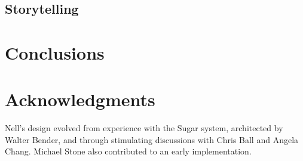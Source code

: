 \documentclass{acm_proc_article-sp}
\begin{document}
\subsection{Storytelling}

\section{Conclusions}

\section{Acknowledgments}
Nell's design evolved from experience with the Sugar system,
architected by Walter Bender, and through stimulating discussions with
Chris Ball and Angela Chang.  Michael Stone also contributed to an
early implementation.

%

%
%
\balancecolumns
\end{document}
